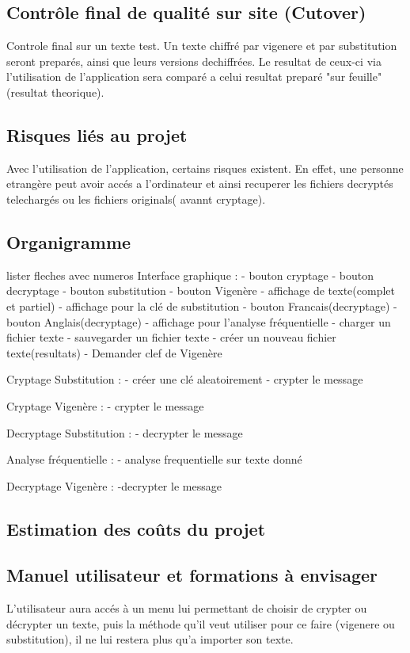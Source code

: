 \documentclass[a4]{article}
\begin{document}
		
		
		\subsection{Contrôle final de qualité sur site (Cutover)}
		Controle final sur un texte test. Un texte chiffré par vigenere et par substitution seront preparés, ainsi que 			leurs versions dechiffrées. Le resultat de ceux-ci via l'utilisation de l'application sera comparé a celui resultat 				preparé "sur feuille"(resultat theorique). 
		\subsection{Risques liés au projet}
		Avec l'utilisation de l'application, certains risques existent. En effet, une personne etrangère peut avoir 			accés a l'ordinateur et ainsi recuperer les fichiers decryptés telechargés ou les fichiers originals( avannt cryptage).
		\subsection{Organigramme}
		
		lister fleches avec numeros
		Interface graphique :
			- bouton cryptage
			- bouton decryptage
			- bouton substitution
			- bouton Vigenère
			- affichage de texte(complet et partiel)
			- affichage pour la clé de substitution
			- bouton Francais(decryptage)
			- bouton Anglais(decryptage)
			- affichage pour l'analyse fréquentielle
			- charger un fichier texte
			- sauvegarder un fichier texte
			- créer un nouveau fichier texte(resultats)
			- Demander clef de Vigenère
			
		Cryptage Substitution :
			- créer une clé aleatoirement
			- crypter le message
			
		Cryptage Vigenère :
			- crypter le message
			
		Decryptage Substitution :
			- decrypter le message
			
		Analyse fréquentielle :
			- analyse frequentielle sur texte donné
			
		Decryptage Vigenère :
			-decrypter le message
		
		\subsection{Estimation des coûts du projet}
		 
		\subsection{Manuel utilisateur et formations à envisager}
			L'utilisateur aura accés à un menu lui permettant de choisir de crypter ou décrypter un texte,
			puis la méthode qu'il veut utiliser pour ce faire (vigenere ou substitution), il ne lui restera 
			plus qu'a importer son texte.
\end{document}
